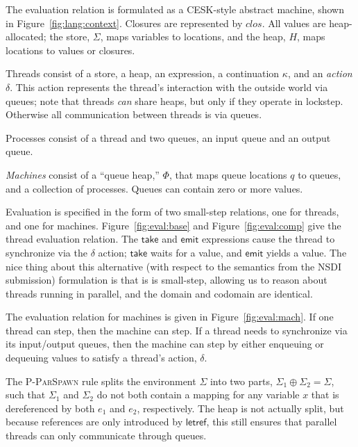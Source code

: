 \documentclass[twocolumn]{article}
\newcommand{\kw}[1]{\textsf{#1}}
\newcommand{\rref}[1]{\textsc{#1}}
\begin{document}
The evaluation relation is formulated as a CESK-style abstract machine, shown in
Figure~\ref{fig:lang:context}. Closures are represented by $clos$. All values
are heap-allocated; the store, $\Sigma$, maps variables to locations, and the
heap, $H$, maps locations to values or closures.

Threads consist of a store, a heap, an expression, a continuation $\kappa$, and
an \emph{action} $\delta$. This action represents the thread's interaction with
the outside world via queues; note that threads \emph{can} share heaps, but only
if they operate in lockstep. Otherwise all communication between threads is via
queues.

Processes consist of a thread and two queues, an input queue and an output
queue.

\emph{Machines} consist of a ``queue heap,'' $\Phi$, that maps queue locations
$q$ to queues, and a collection of processes. Queues can contain zero or more
values.

Evaluation is specified in the form of two small-step relations, one for
threads, and one for machines. Figure~\ref{fig:eval:base} and
Figure~\ref{fig:eval:comp} give the thread evaluation relation. The $\kw{take}$
and $\kw{emit}$ expressions cause the thread to synchronize via the $\delta$
action; $\kw{take}$ waits for a value, and $\kw{emit}$ yields a value. The nice
thing about this alternative (with respect to the semantics from the NSDI
submission) formulation is that is is small-step, allowing us to reason about
threads running in parallel, and the domain and codomain are identical.

The evaluation relation for machines is given in Figure~\ref{fig:eval:mach}. If
one thread can step, then the machine can step. If a thread needs to synchronize
via its input/output queues, then the machine can step by either enqueuing or
dequeuing values to satisfy a thread's action, $\delta$.

The \rref{P-ParSpawn} rule splits the environment $\Sigma$ into two parts,
$\Sigma_1 \oplus \Sigma_2 = \Sigma$, such that $\Sigma_1$ and $\Sigma_2$ do not
both contain a mapping for any variable $x$ that is dereferenced by both $e_1$
and $e_2$, respectively. The heap is not actually split, but because references
are only introduced by $\kw{letref}$, this still ensures that parallel threads
can only communicate through queues.
\end{document}
